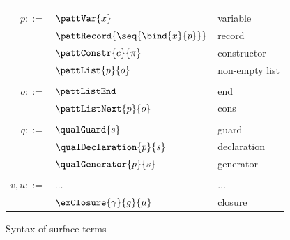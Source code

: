 \begin{figure}
{\begin{minipage}[t]{0.5\textwidth}
\begin{tabularx}{\textwidth}{rL{2.8cm}L{2.9cm}}
      &&
      \\
      $p ::=$
      &
      $\pattVar{x}$
      &
      variable
      \\
      &
      $\pattRecord{\seq{\bind{x}{p}}}$
      &
      record
      \\
      &
      $\pattConstr{c}{\pi}$
      &
      constructor
      \\
      &
      $\pattList{p}{o}$
      &
      non-empty list
      \\[2mm]
      &&
      \\
      $o ::=$
      &
      $\pattListEnd$
      &
      end
      \\
      &
      $\pattListNext{p}{o}$
      &
      cons
      \\[2mm]
      &&
      \\
      $q ::=$
      &
      $\qualGuard{s}$
      &
      guard
      \\
      &
      $\qualDeclaration{p}{s}$
      &
      declaration
      \\
      &
      $\qualGenerator{p}{s}$
      &
      generator
      \\[2mm]
      &&
      \\
      $v, u ::=$
      &
      $\dots$
      &
      $\dots$
      \\
      &
      $\exClosure{\gamma}{g}{\mu}$
      &
      closure
      \\[8mm]
      \end{tabularx}
   \end{minipage}
   }
   \caption{Syntax of surface terms}
\end{figure}
